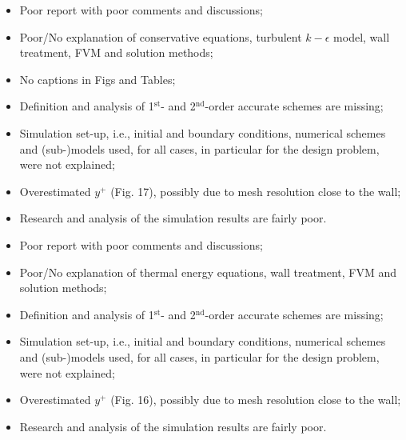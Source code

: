 \documentclass[14pt,twoside]{report}
\newcommand\blankpage{%
    \null
    \thispagestyle{empty}%
    \addtocounter{page}{-1}%
    \newpage}
\begin{document}
\medskip

  \begin{itemize}
%
     \item Poor report with poor comments and discussions;
     \item Poor/No explanation of conservative equations, turbulent $k-\epsilon$ model, wall treatment, FVM and solution methods;
     \item No captions in Figs and Tables;
     \item Definition and analysis of 1$^{\text{st}}$- and 2$^{\text{nd}}$-order accurate schemes are missing;
     \item Simulation set-up, i.e., initial and boundary conditions, numerical schemes and (sub-)models used, for all cases, in particular for the design problem, were not explained;
     \item Overestimated $y^{+}$ (Fig. 17), possibly due to mesh resolution close to the wall;
     \item Research and analysis of the simulation results are fairly poor.
%
  \end{itemize}%

\clearpage 



\bigskip


\medskip

  \begin{itemize}
%
     \item Poor report with poor comments and discussions;
     \item Poor/No explanation of thermal energy equations, wall treatment, FVM and solution methods;
     \item Definition and analysis of 1$^{\text{st}}$- and 2$^{\text{nd}}$-order accurate schemes are missing;
     \item Simulation set-up, i.e., initial and boundary conditions, numerical schemes and (sub-)models used, for all cases, in particular for the design problem, were not explained;
     \item Overestimated $y^{+}$ (Fig. 16), possibly due to mesh resolution close to the wall;
     \item Research and analysis of the simulation results are fairly poor.
%
  \end{itemize}%
\end{document}
